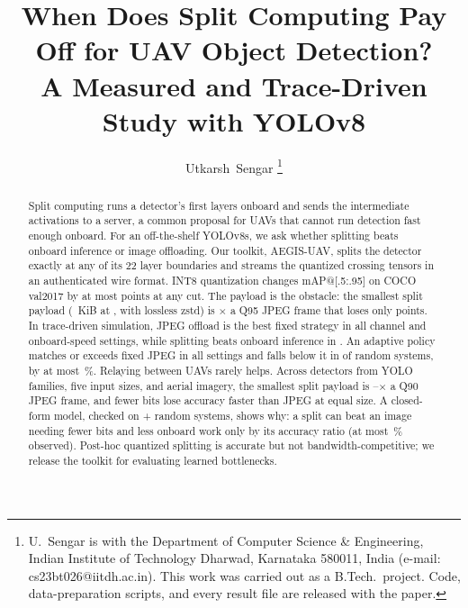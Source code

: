 \documentclass[journal,twocolumn,10pt]{IEEEtran}
\begin{document}
\title{When Does Split Computing Pay Off for UAV Object Detection?\\A Measured and Trace-Driven Study with YOLOv8}

\author{Utkarsh~Sengar%
\thanks{U.~Sengar is with the Department of Computer Science \& Engineering, Indian Institute of Technology Dharwad, Karnataka 580011, India (e-mail: cs23bt026@iitdh.ac.in). This work was carried out as a B.Tech.\ project. Code, data-preparation scripts, and every result file are released with the paper.}}


\maketitle

\begin{abstract}
Split computing runs a detector's first layers onboard and sends the intermediate activations to a server, a common proposal for UAVs that cannot run detection fast enough onboard. For an off-the-shelf YOLOv8s, we ask whether splitting beats onboard inference or image offloading. Our toolkit, AEGIS-UAV, splits the detector exactly at any of its 22 layer boundaries and streams the quantized crossing tensors in an authenticated wire format. INT8 quantization changes mAP@[.5:.95] on COCO val2017 by at most \MaxAbsDeltaINT{} points at any cut. The payload is the obstacle: the smallest split payload (\MinSplitKiB{}~KiB at \MinSplitCut{}, with lossless zstd) is \RatioMinSplitOverJPEGQNinetyFive$\times$ a Q95 JPEG frame that loses only \JPEGDeltaQNinetyFive{} points. In trace-driven simulation, JPEG offload is the best fixed strategy in all \NumCells{} channel and onboard-speed settings, while splitting beats onboard inference in \SplitBeatsOnboardCells{}. An adaptive policy matches or exceeds fixed JPEG in all \NumCells{} settings and falls below it in \GenAdaptiveBelowJpegN{} of \GenAdaptiveScenariosN{} random systems, by at most \GenAdaptiveVsJpegWorstPct\,\%. Relaying between UAVs rarely helps. Across \GenNModels{} detectors from \GenNFamilies{} YOLO families, five input sizes, and aerial imagery, the smallest split payload is \GenRatioMin--\GenRatioMax$\times$ a Q90 JPEG frame, and fewer bits lose accuracy faster than JPEG at equal size. A closed-form model, checked on \GenNScenarios{} + \GenNSwarmScenarios{} random systems, shows why: a split can beat an image needing fewer bits and less onboard work only by its accuracy ratio (at most \GenMaxSplitGainPct\,\% observed). Post-hoc quantized splitting is accurate but not bandwidth-competitive; we release the toolkit for evaluating learned bottlenecks.
\end{abstract}
\end{document}
